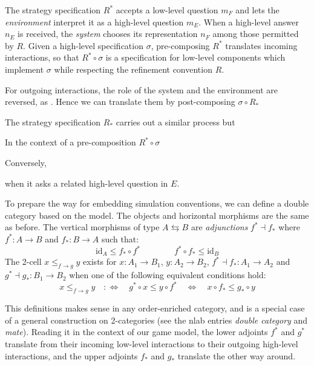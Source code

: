 \documentclass[sigplan,10pt,authordraft]{acmart}
\begin{document}
The strategy specification $R^*$
accepts a low-level question $m_F$ %
and lets the \emph{environment} interpret it as
a high-level question $m_E$. %
When a high-level answer $n_E$ is received, %
the \emph{system} chooses
its representation $n_F$ %
among those permitted by $R$.
Given a high-level specification $\sigma$,
pre-composing $R^*$ translates incoming interactions,
so that $R^* \circ \sigma$
is a specification for low-level components
which implement $\sigma$
while respecting the refinement convention $R$.

For outgoing interactions,
the role of the system and the environment are reversed,
as .
Hence we can translate them
by post-composing $\sigma \circ R_*$


The strategy specification $R_*$
carries out a similar process but





In the context of a pre-composition $R^* \circ \sigma$

Conversely,


when it asks a related high-level question in $E$.



To prepare the way for embedding simulation conventions,
we can define a double category based on the model.
The objects and horizontal morphisms
are the same as before.
The vertical morphisms of type $A \leftrightarrows B$
are \emph{adjunctions} $f^* \dashv f_*$
where $f^* : A \rightarrow B$ and $f_* : B \rightarrow A$
such that:
\[
  \mathrm{id}_A \le f_* \circ f^*
  \qquad \qquad
  f^* \circ f_* \le \mathrm{id}_B
\]
The 2-cell $x \le_{f \rightarrow g} y$
exists for
$x : A_1 \rightarrow B_1$,
$y : A_2 \rightarrow B_2$,
$f^* \dashv f_* : A_1 \rightarrow A_2$ and
$g^* \dashv g_* : B_1 \rightarrow B_2$
when one of the following equivalent conditions hold:
\begin{equation} \label{eqn:gc}
  x \le_{f \rightarrow g} y
  \quad :\Leftrightarrow \quad
  g^* \circ x \le y \circ f^*
  \quad \Leftrightarrow \quad
  x \circ f_* \le g_* \circ y
\end{equation}

This definitions makes sense in any order-enriched category,
and is a special case of a general construction on 2-categories
(see the nlab entries \emph{double category} and \emph{mate}).
Reading it in the context of our game model,
the lower adjoints $f^*$ and $g^*$
translate from their incoming low-level interactions
to their outgoing high-level interactions,
and the upper adjoints $f_*$ and $g_*$
translate the other way around.
\end{document}
